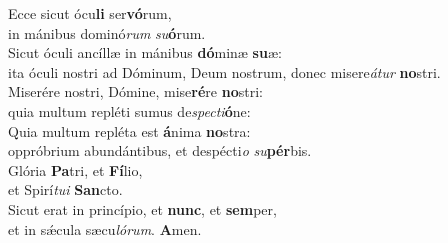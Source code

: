 \evenverse Ecce sicut ócu\textbf{li} ser\textbf{vó}rum,~\*\\
\evenverse in mánibus dominó\textit{rum} \textit{su}\textbf{ó}rum.\\
\oddverse Sicut óculi ancíllæ in mánibus \textbf{dó}minæ \textbf{su}æ:~\*\\
\oddverse ita óculi nostri ad Dóminum, Deum nostrum, donec misere\textit{á}\textit{tur} \textbf{no}stri.\\
\evenverse Miserére nostri, Dómine, mise\textbf{ré}re \textbf{no}stri:~\*\\
\evenverse quia multum repléti sumus de\textit{spe}\textit{cti}\textbf{ó}ne:\\
\oddverse Quia multum repléta est \textbf{á}nima \textbf{no}stra:~\*\\
\oddverse oppróbrium abundántibus, et despécti\textit{o} \textit{su}\textbf{pér}bis.\\
\evenverse Glória \textbf{Pa}tri, et \textbf{Fí}lio,~\*\\
\evenverse et Spirí\textit{tu}\textit{i} \textbf{San}cto.\\
\oddverse Sicut erat in princípio, et \textbf{nunc}, et \textbf{sem}per,~\*\\
\oddverse et in sǽcula sæcu\textit{ló}\textit{rum}. \textbf{A}men.\\
